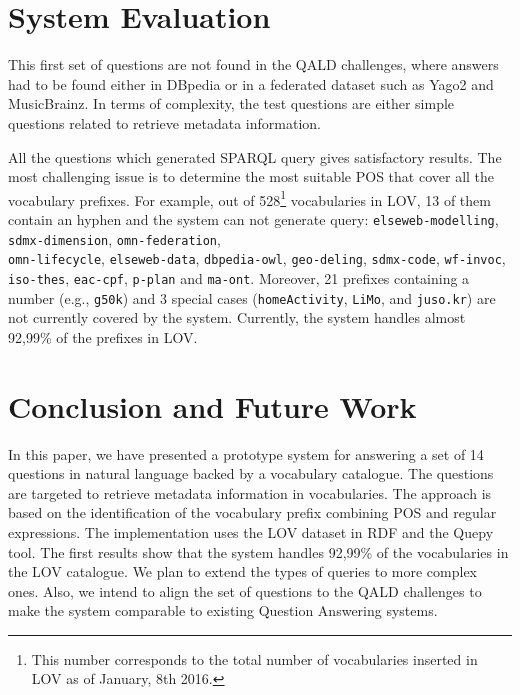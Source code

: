 \documentclass[runningheads,a4paper]{llncs}
\newcommand{\todo}[1]{\noindent\textcolor{red}{{\bf \{TODO}: #1{\bf \}}}}
\begin{document}

\section{System Evaluation}
\label{sec:evaluation}

This first set of questions are not found in the QALD challenges, where answers had to be found either in DBpedia or in a federated dataset such as Yago2 and MusicBrainz. In terms of complexity, the test questions are either simple questions related to retrieve metadata information. 

All the questions which generated SPARQL query gives satisfactory results. The most challenging issue is to determine the most suitable POS that cover all the vocabulary prefixes. For example, out of 528\footnote{This number corresponds to the total number of vocabularies inserted in LOV as of January, 8th 2016.} vocabularies in LOV, 13 of them contain an hyphen and the system can not generate query: \texttt{elseweb-modelling}, \texttt{sdmx-dimension}, \texttt{omn-federation}, \\ \texttt{omn-lifecycle}, \texttt{elseweb-data}, \texttt{dbpedia-owl}, \texttt{geo-deling}, \texttt{sdmx-code}, \texttt{wf-invoc}, \texttt{iso-thes}, \texttt{eac-cpf}, \texttt{p-plan} and \texttt{ma-ont}. Moreover, 21 prefixes containing a number (e.g., \texttt{g50k}) and 3 special cases (\texttt{homeActivity}, \texttt{LiMo}, and \texttt{juso.kr}) are not currently covered by the system. Currently, the system handles almost 92,99\% of the prefixes in LOV.






\section{Conclusion and Future Work}
\label{sec:conclusion}
%

In this paper, we have presented a prototype system for answering a set of 14 questions in natural language backed by a vocabulary catalogue. The questions are targeted to retrieve metadata information in vocabularies. The approach is based on the identification of the vocabulary prefix combining POS and regular expressions. The implementation uses the LOV dataset in RDF and the Quepy tool. The first results show that the system handles 92,99\% of the vocabularies in the LOV catalogue. 
We plan to extend the types of queries to more complex ones. Also, we intend to align the set of questions to the QALD challenges to make the system comparable to existing Question Answering systems.  
\end{document}
